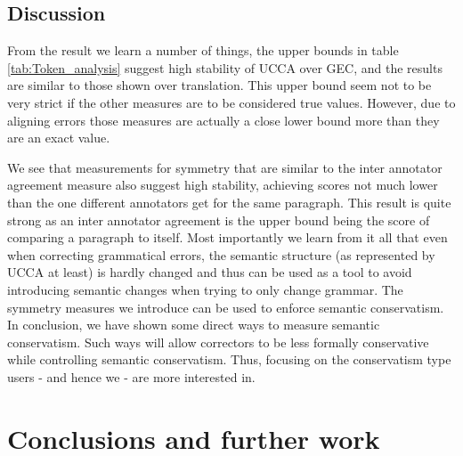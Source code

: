 \documentclass[english]{article}
\begin{document}
	\subsection{Discussion}
	
	From the result we learn a number of things, the upper
	bounds in table \ref{tab:Token_analysis} suggest high stability of UCCA over GEC, and the results are similar to those shown over
	translation. This upper bound seem not to be very strict if the other
	measures are to be considered true values. 
	However, due to aligning errors those measures are actually a close lower bound more than they are an exact value.
	
	We see that measurements for symmetry that are similar to the inter
	annotator agreement measure also suggest high stability, achieving
	scores not much lower than the one different annotators get for the
	same paragraph. This result is quite strong as an inter annotator
	agreement is the upper bound being the score of comparing a paragraph to itself. 
	Most importantly we learn from it all that even when correcting grammatical errors, the semantic structure (as represented by UCCA at least) is hardly changed and thus can be used as a tool to avoid introducing semantic changes when trying to only change grammar. 
	The symmetry measures we introduce can be used to enforce semantic conservatism.
	In conclusion, we have shown some direct ways to measure
	semantic conservatism. Such ways will allow correctors to be less formally conservative while controlling semantic conservatism. Thus, focusing on the conservatism type users - and hence we - are more interested in.


\section{Conclusions and further work}



\appendix
\section{}
\end{document}
